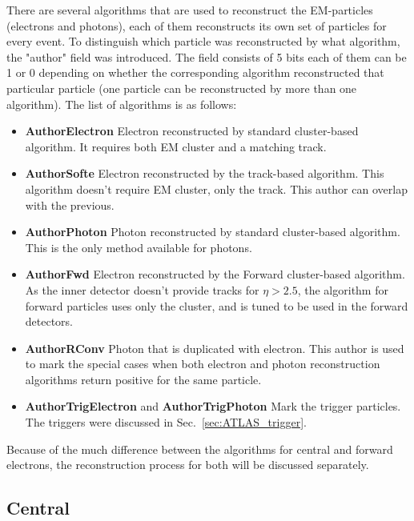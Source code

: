 There are several algorithms that are used to reconstruct the EM-particles (electrons and photons), each of them reconstructs its own set of particles for every event. To distinguish which particle was reconstructed by what algorithm, the "author" field was introduced. The field consists of 5 bits each of them can be 1 or 0 depending on whether the corresponding algorithm reconstructed that particular particle (one particle can be reconstructed by more than one algorithm). The list of algorithms is as follows:
\begin{itemize}
\item {\bfseries AuthorElectron} Electron reconstructed by standard cluster-based algorithm. It requires both EM cluster and a matching track.
\item {\bfseries AuthorSofte} Electron reconstructed by the track-based algorithm. This algorithm doesn't require EM cluster, only the track. This author can overlap with the previous.
\item {\bfseries AuthorPhoton} Photon reconstructed by standard cluster-based algorithm. This is the only method available for photons.
\item {\bfseries AuthorFwd} Electron reconstructed by the Forward cluster-based algorithm. As the inner detector doesn't provide tracks for $\eta > 2.5$, the algorithm for forward particles uses only the cluster, and is tuned to be used in the forward detectors.
\item {\bfseries AuthorRConv} Photon that is duplicated with electron. This author is used to mark the special cases when both electron and photon reconstruction algorithms return positive for the same particle.
\item {\bfseries AuthorTrigElectron} and {\bfseries AuthorTrigPhoton} Mark the trigger particles. The triggers were discussed in Sec.~\ref{sec:ATLAS_trigger}.
\end{itemize}

Because of the much difference between the algorithms for central and forward electrons, the reconstruction process for both will be discussed separately.

\subsection{Central}

